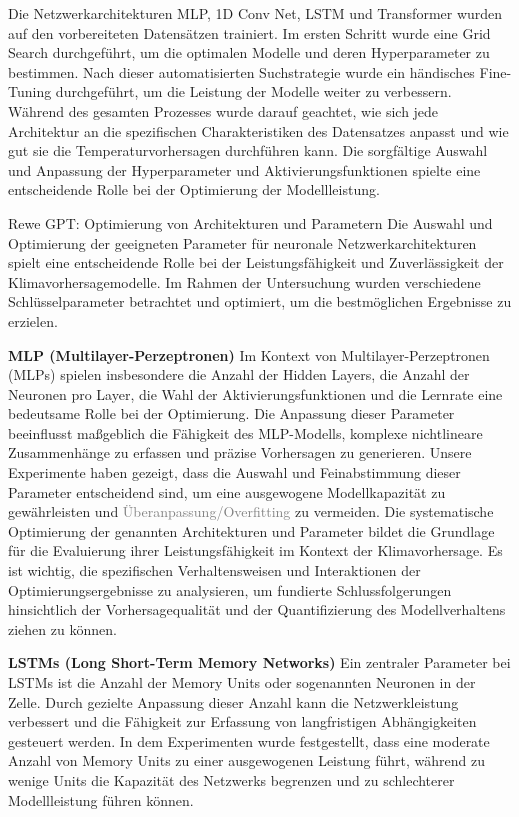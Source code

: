 \documentclass[manuscript,screen,review]{acmart}
\begin{document}
Die Netzwerkarchitekturen MLP, 1D Conv Net, LSTM und Transformer wurden auf den vorbereiteten Datensätzen trainiert. 
Im ersten Schritt wurde eine Grid Search durchgeführt, um die optimalen Modelle und deren Hyperparameter zu bestimmen. 
Nach dieser automatisierten Suchstrategie wurde ein händisches Fine-Tuning durchgeführt, um die Leistung der Modelle weiter zu verbessern. 
Während des gesamten Prozesses wurde darauf geachtet, wie sich jede Architektur an die spezifischen Charakteristiken des Datensatzes anpasst und 
wie gut sie die Temperaturvorhersagen durchführen kann. 
Die sorgfältige Auswahl und Anpassung der Hyperparameter und Aktivierungsfunktionen spielte eine entscheidende Rolle bei der Optimierung der Modellleistung.

Rewe GPT:
Optimierung von Architekturen und Parametern
Die Auswahl und Optimierung der geeigneten Parameter für neuronale Netzwerkarchitekturen spielt eine entscheidende Rolle bei der Leistungsfähigkeit und Zuverlässigkeit der Klimavorhersagemodelle. 
Im Rahmen der Untersuchung wurden verschiedene Schlüsselparameter betrachtet und optimiert, um die bestmöglichen Ergebnisse zu erzielen.

\textbf{MLP (Multilayer-Perzeptronen)}
Im Kontext von Multilayer-Perzeptronen (MLPs) spielen insbesondere die Anzahl der Hidden Layers, die Anzahl der Neuronen pro Layer, 
die Wahl der Aktivierungsfunktionen und die Lernrate eine bedeutsame Rolle bei der Optimierung. 
Die Anpassung dieser Parameter beeinflusst maßgeblich die Fähigkeit des MLP-Modells, komplexe nichtlineare Zusammenhänge zu erfassen und präzise Vorhersagen zu generieren. 
Unsere Experimente haben gezeigt, dass die Auswahl und Feinabstimmung dieser Parameter entscheidend sind, um eine ausgewogene Modellkapazität zu gewährleisten und \textcolor{gray}{Überanpassung/Overfitting} zu vermeiden.
Die systematische Optimierung der genannten Architekturen und Parameter bildet die Grundlage für die Evaluierung ihrer Leistungsfähigkeit im Kontext der Klimavorhersage. 
Es ist wichtig, die spezifischen Verhaltensweisen und Interaktionen der Optimierungsergebnisse zu analysieren, um fundierte Schlussfolgerungen hinsichtlich der Vorhersagequalität und der Quantifizierung des Modellverhaltens ziehen zu können.

\textbf{LSTMs (Long Short-Term Memory Networks)}
Ein zentraler Parameter bei LSTMs ist die Anzahl der Memory Units oder sogenannten Neuronen in der Zelle. Durch gezielte Anpassung dieser Anzahl kann die Netzwerkleistung verbessert 
und die Fähigkeit zur Erfassung von langfristigen Abhängigkeiten gesteuert werden. 
In dem Experimenten wurde festgestellt, dass eine moderate Anzahl von Memory Units zu einer ausgewogenen Leistung führt, während zu wenige Units die Kapazität des Netzwerks begrenzen und zu schlechterer Modellleistung führen können.
\end{document}
